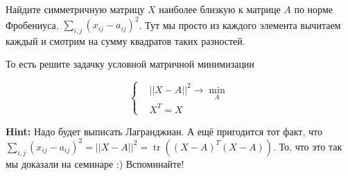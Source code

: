 \documentclass[12pt, a4paper, oneside]{article}
\theoremstyle{plain} %
\theoremstyle{definition}
\DeclareMathOperator{\tr}{tr}
\begin{document}
\begin{problem}{}
	Найдите симметричную матрицу $X$ наиболее близкую к матрице $A$ по норме Фробениуса, $\sum_{i,j} (x_{ij} - a_{ij})^2$. Тут мы просто из каждого элемента вычитаем каждый и смотрим на сумму квадратов таких разностей. 
	
	То есть решите задачку условной матричной минимизации 
	
	\begin{equation*}
	\begin{cases}
	& ||X - A||^2 \to \min_{A}  \\
	& X^T = X
	\end{cases}
	\end{equation*}
	
	\textbf{Hint:} Надо будет выписать Лагранджиан.  А ещё пригодится тот факт, что $\sum_{i,j} (x_{ij} - a_{ij})^2 = ||X-A||^2 =  \tr((X-A)^T (X-A))$. То, что это так мы доказали на семинаре :) Вспоминайте! 
\end{problem}
\end{document}

